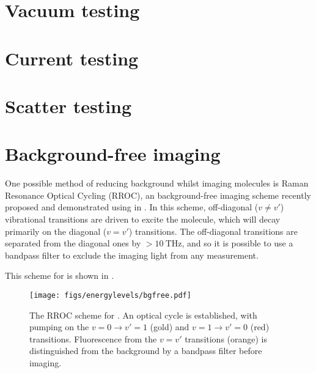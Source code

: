 \section{Vacuum testing}


\section{Current testing}


\section{Scatter testing}


\section{Background-free imaging}

One possible method of reducing background whilst imaging molecules is Raman
Resonance Optical Cycling (RROC), an background-free imaging scheme recently proposed
and demonstrated using \SrF{} in . In this scheme,
off-diagonal ($v\neq v'$) vibrational transitions are driven to excite the
molecule, which will decay primarily on the diagonal ($v=v'$) transitions. The
off-diagonal transitions are separated from the diagonal ones by
$>\SI{10}{\tera\hertz}$, and so it is possible to use a bandpass filter to
exclude the imaging light from any measurement.

This scheme for \CaF{} is shown in .

\begin{figure}
  \centering
  \texttt{[image: figs/energylevels/bgfree.pdf]}
  \caption{
  The RROC scheme for \CaF{}. An optical cycle is established, with pumping on
  the $v=0 \rightarrow v'=1$ (gold) and $v=1 \rightarrow v'=0$ (red) transitions.
  Fluorescence from the $v=v'$ transitions (orange) is distinguished from the
  background by a bandpass filter before imaging.
  }
  \label{exper:fig:bgfreelevels}
\end{figure}
